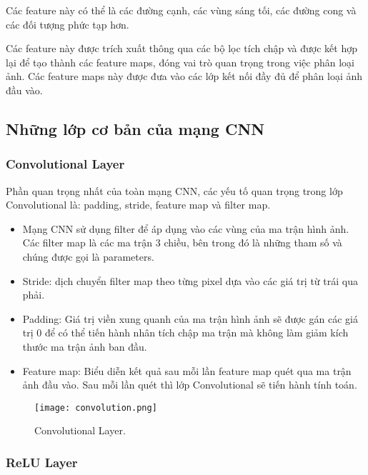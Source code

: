 Các feature này có thể là các đường cạnh, các vùng sáng tối, các đường cong và các đối tượng phức tạp hơn. 

Các feature này được trích xuất thông qua các bộ lọc tích chập và được kết hợp lại để tạo thành các feature maps, đóng vai trò quan trọng trong việc phân loại ảnh. Các feature maps này được đưa vào các lớp kết nối đầy đủ để phân loại ảnh đầu vào.

\subsection{Những lớp cơ bản của mạng CNN}

\subsubsection{Convolutional Layer}

Phần quan trọng nhất của toàn mạng CNN, các yếu tố quan trọng trong lớp Convolutional là: padding, stride, feature map và filter map.

\begin{itemize}
	\item Mạng CNN sử dụng filter để áp dụng vào các vùng của ma trận hình ảnh. Các filter map là các ma trận 3 chiều, bên trong đó là những tham số và chúng được gọi là parameters.
	
	\item Stride: dịch chuyển filter map theo từng pixel dựa vào các giá trị từ trái qua phải.
	
	\item Padding: Giá trị viền xung quanh của ma trận hình ảnh sẽ được gán các giá trị 0 để có thể tiến hành nhân tích chập ma trận mà không làm giảm kích thước ma trận ảnh ban đầu.
	
	\item Feature map: Biểu diễn kết quả sau mỗi lần feature map quét qua ma trận ảnh đầu vào. Sau mỗi lần quét thì lớp Convolutional sẽ tiến hành tính toán.
\end{itemize}

\begin{figure}[h!]
	\centering
	\texttt{[image: convolution.png]}
	\caption[Convolutional Layer.]{Convolutional Layer.}
	\label{fig:convolution} 
\end{figure}

\subsubsection{ReLU Layer}

